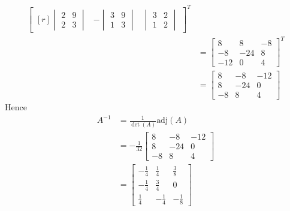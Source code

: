 \begin{Answer}
\begin{enumerate}[label=(\alph*)]
\begin{align*}
\begin{bmatrix*}[r]
\begin{vmatrix}
2 & 9 \\
2 & 3
\end{vmatrix} &
-\begin{vmatrix}
3 & 9 \\
1 & 3
\end{vmatrix} &
\begin{vmatrix}
3 & 2 \\
1 & 2
\end{vmatrix} 
\end{bmatrix*}^T \\
&=
\begin{bmatrix}
8 & 8 & -8 \\
-8 & -24 & 8 \\
-12 & 0 & 4
\end{bmatrix}^T \\
&=
\begin{bmatrix}
8 & -8 & -12 \\
8 & -24 & 0 \\
-8 & 8 & 4
\end{bmatrix}   
\end{align*}
Hence 
\begin{align*}
A^{-1} &= \frac{1}{\det(A)} \text{adj}(A) \\
&= -\frac{1}{32}
\begin{bmatrix}
8 & -8 & -12 \\
8 & -24 & 0 \\
-8 & 8 & 4
\end{bmatrix} \\
&= 
\begin{bmatrix}
-\frac{1}{4} & \frac{1}{4} & \frac{3}{8} \\
-\frac{1}{4} & \frac{3}{4} & 0 \\
\frac{1}{4} & -\frac{1}{4} & -\frac{1}{8}
\end{bmatrix}
\end{align*}
\end{enumerate}
\end{Answer}

